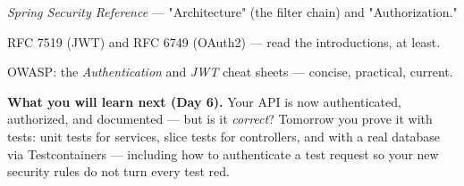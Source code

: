 \begin{wbitem}
  \item \emph{Spring Security Reference} --- "Architecture" (the filter chain) and "Authorization."
  \item RFC 7519 (JWT) and RFC 6749 (OAuth2) --- read the introductions, at least.
  \item OWASP: the \emph{Authentication} and \emph{JWT} cheat sheets --- concise, practical, current.
\end{wbitem}

\begin{keyidea}
\textbf{What you will learn next (Day 6).} Your API is now authenticated, authorized, and documented --- but is it \emph{correct}? Tomorrow you prove it with tests: unit tests for services, slice tests for controllers, and  with a real database via Testcontainers --- including how to authenticate a test request so your new security rules do not turn every test red.
\end{keyidea}
